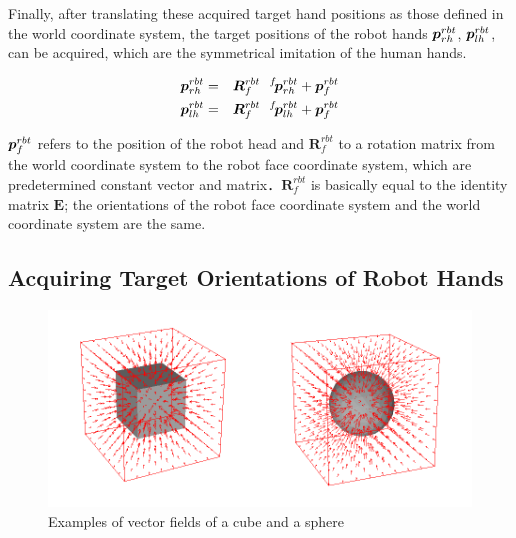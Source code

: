 Finally, after translating these acquired target hand positions as those defined in the world coordinate system, the target positions of the robot hands \(\mbox{\boldmath $p$}^{rbt}_{rh}\), \(\mbox{\boldmath $p$}^{rbt}_{lh}\), can be acquired, which are the symmetrical imitation of the human hands.

\vspace{-3mm}
\begin{eqnarray}
  \vector{p}^{rbt}_{rh} &=& \bm{R}^{rbt}_{f} \ \ ^{f}\!\vector{p}^{rbt}_{rh} + \vector{p}^{rbt}_{f}\\
  \vector{p}^{rbt}_{lh} &=& \bm{R}^{rbt}_{f} \ \ ^{f}\!\vector{p}^{rbt}_{lh} + \vector{p}^{rbt}_{f}
  \label{equation:robot_hand_pos}
\end{eqnarray}

\(\mbox{\boldmath $p$}^{rbt}_{f}\) refers to the position of the robot head and \(\bm{R}^{rbt}_{f}\) to a rotation matrix from the world coordinate system to the robot face coordinate system, which are predetermined constant vector and matrix．\(\bm{R}^{rbt}_{f}\) is basically equal to the identity matrix \(\bm{E}\); the orientations of the robot face coordinate system and the world coordinate system are the same.

\subsection{Acquiring Target Orientations of Robot Hands}
\label{subsec:orientation}

\begin{figure}[htbp]
 \begin{center}
  \includegraphics[width=0.70\columnwidth]{figs/electronic-potential-cube-sphere.png}
  \vspace{-3mm}
  \caption{Examples of vector fields of a cube and a sphere}
  \label{figure:electronic_potential}
 \end{center}
\end{figure}

